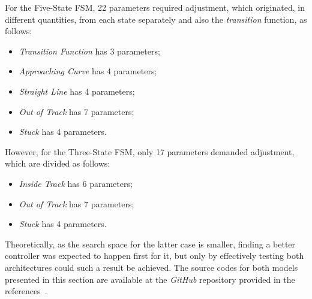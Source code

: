 	For the Five-State FSM, 22 parameters required adjustment, which originated, in different quantities, from each state separately and also the \emph{transition} function, as follows:
	
	\begin{itemize}
		
		\item \emph{Transition Function} has 3 parameters;
		
		\item \emph{Approaching Curve} has 4 parameters;
		
		\item \emph{Straight Line} has 4 parameters;
		
		\item \emph{Out of Track} has 7 parameters;
		
		\item \emph{Stuck} has 4 parameters.
		
	\end{itemize}
	
	However, for the Three-State FSM, only 17 parameters demanded adjustment, which are divided as follows:
	
	\begin{itemize}
		
		\item \emph{Inside Track} has 6 parameters;
		
		\item \emph{Out of Track} has 7 parameters;
		
		\item \emph{Stuck} has 4 parameters.
		
	\end{itemize}
	
	Theoretically, as the search space for the latter case is smaller, finding a better controller was expected to happen first for it, but only by effectively testing both architectures could such a result be achieved. The source codes for both models presented in this section are available at the \emph{GitHub} repository provided in the references~\cite{GitHub}.

